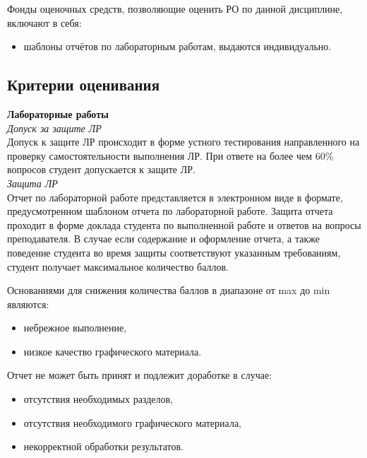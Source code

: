 Фонды оценочных средств, позволяющие оценить РО по данной дисциплине, включают в себя:
\begin{itemize}
\item шаблоны отчётов по лабораторным работам, выдаются индивидуально.
\end{itemize}

\subsection*{Критерии оценивания}




\noindent\textbf{Лабораторные работы}\\
\textit{Допуск за защите ЛР}\\
Допуск к защите ЛР происходит в форме устного тестирования направленного на проверку самостоятельности выполнения ЛР. При ответе на более чем 60\% вопросов студент допускается к защите ЛР.\\

\noindent\textit{Защита ЛР}\\
Отчет по лабораторной работе представляется в электронном виде в формате, предусмотренном шаблоном отчета по лабораторной работе.
Защита отчета проходит в форме доклада студента по выполненной работе и ответов на вопросы преподавателя.
В случае если содержание и оформление отчета, а также поведение студента во время защиты соответствуют указанным требованиям, студент получает максимальное количество баллов.

Основаниями для снижения количества баллов в диапазоне от max до min являются:
\begin{itemize}
\item небрежное выполнение,
\item низкое качество графического материала.
\end{itemize}

Отчет не может быть принят и подлежит доработке в случае:
\begin{itemize}
\item отсутствия необходимых разделов,
\item отсутствия необходимого графического материала,
\item некорректной обработки результатов.
\end{itemize}




